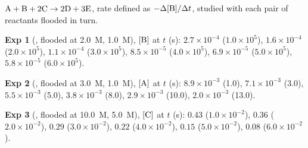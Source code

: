 \documentclass{apchem-exam}
\begin{document}
\begin{rubric}
\end{rubric}


$\ce{A} + \ce{B} + 2\ce{C} \to 2\ce{D} + 3\ce{E}$, rate defined as
$-\Delta[\ce{B}]/\Delta t$, studied with each pair of reactants flooded in
turn.

\textbf{Exp 1} (,  flooded at 2.0~M, 1.0~M), $[\ce{B}]$ at $t$
(s): $2.7\times10^{-4}$ ($1.0\times10^5$), $1.6\times10^{-4}$
($2.0\times10^5$), $1.1\times10^{-4}$ ($3.0\times10^5$),
$8.5\times10^{-5}$ ($4.0\times10^5$), $6.9\times10^{-5}$
($5.0\times10^5$), $5.8\times10^{-5}$ ($6.0\times10^5$).

\textbf{Exp 2} (,  flooded at 3.0~M, 1.0~M), $[\ce{A}]$ at $t$
(s): $8.9\times10^{-3}$ (1.0), $7.1\times10^{-3}$ (3.0), $5.5\times10^{-3}$
(5.0), $3.8\times10^{-3}$ (8.0), $2.9\times10^{-3}$ (10.0),
$2.0\times10^{-3}$ (13.0).

\textbf{Exp 3} (,  flooded at 10.0~M, 5.0~M), $[\ce{C}]$ at $t$
(s): $0.43$ ($1.0\times10^{-2}$), $0.36$ ($2.0\times10^{-2}$), $0.29$
($3.0\times10^{-2}$), $0.22$ ($4.0\times10^{-2}$), $0.15$
($5.0\times10^{-2}$), $0.08$ ($6.0\times10^{-2}$).
\end{document}
